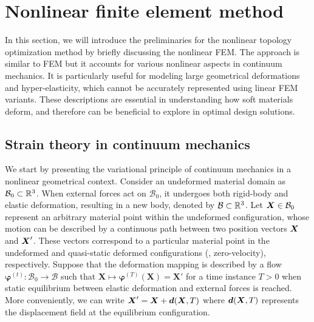 \vspace{-3mm}
\section{Nonlinear finite element method} \label{sec:C1:fem}
In this section, we will introduce the preliminaries for the nonlinear topology optimization method by briefly discussing the nonlinear FEM. The approach is similar to FEM but it accounts for various nonlinear aspects in continuum mechanics. It is particularly useful for modeling large geometrical deformations and hyper-elasticity, which cannot be accurately represented using linear FEM variants. These descriptions are essential in understanding how soft materials deform, and therefore can be beneficial to explore in optimal design solutions.

\subsection{Strain theory in continuum mechanics}
We start by presenting the variational principle of continuum mechanics in a nonlinear geometrical context. Consider an undeformed material domain as $\mathcal{B}_0 \subset \mathbb{R}^3$. When external forces act on $\mathcal{B}_0$, it undergoes both rigid-body and elastic deformation, resulting in a new body, denoted by $\mathcal{B} \subset \mathbb{R}^3$. Let ${\boldsymbol{X}} \in \mathcal{B}_0$ represent an arbitrary material point within the undeformed configuration, whose motion can be described by a continuous path between two position vectors ${\boldsymbol{X}}$ and ${\boldsymbol{X}}'$. These vectors correspond to a particular material point in the undeformed and quasi-static deformed configurations (\ie, zero-velocity), respectively. Suppose that the deformation mapping is described by a flow $\boldsymbol{\varphi}^{(t)}: \mathcal{B}_0 \to \mathcal{B}$ such that $\boldsymbol{X} \mapsto \boldsymbol{\varphi}^{(T)}(\boldsymbol{X}) = \boldsymbol{X}'$ for a time instance $T > 0$ when static equilibrium between elastic deformation and external forces is reached. More conveniently, we can write $\boldsymbol{X}' = \boldsymbol{X} + {\boldsymbol{d}}(\boldsymbol{X},T)$ where ${\boldsymbol{d}}({\boldsymbol{X}},T)$ represents the displacement field at the equilibrium configuration.

